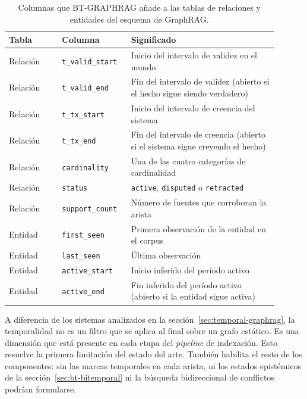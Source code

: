 \begin{table}[h]
\centering
\small
\begin{tabular}{p{0.18\linewidth}p{0.22\linewidth}p{0.50\linewidth}}
\hline
\textbf{Tabla} & \textbf{Columna} & \textbf{Significado} \\ \hline
Relación & \texttt{t\_valid\_start} & Inicio del intervalo de validez en el mundo \\
Relación & \texttt{t\_valid\_end} & Fin del intervalo de validez (abierto si el hecho sigue siendo verdadero) \\
Relación & \texttt{t\_tx\_start} & Inicio del intervalo de creencia del sistema \\
Relación & \texttt{t\_tx\_end} & Fin del intervalo de creencia (abierto si el sistema sigue creyendo el hecho) \\
Relación & \texttt{cardinality} & Una de las cuatro categorías de cardinalidad \\
Relación & \texttt{status} & \texttt{active}, \texttt{disputed} o \texttt{retracted} \\
Relación & \texttt{support\_count} & Número de fuentes que corroboran la arista \\
Entidad  & \texttt{first\_seen} & Primera observación de la entidad en el corpus \\
Entidad  & \texttt{last\_seen} & Última observación \\
Entidad  & \texttt{active\_start} & Inicio inferido del período activo \\
Entidad  & \texttt{active\_end}   & Fin inferido del período activo (abierto si la entidad sigue activa) \\ \hline
\end{tabular}
\caption{Columnas que BT-GRAPHRAG añade a las tablas de relaciones y entidades del esquema de GraphRAG.}
\label{tab:bt-schema}
\end{table}

A diferencia de los sistemas analizados en la sección~\ref{sec:temporal-graphrag}, la temporalidad no es un filtro que se aplica al final sobre un grafo estático. Es una dimensión que está presente en cada etapa del \emph{pipeline} de indexación. Esto resuelve la primera limitación del estado del arte. También habilita el resto de los componentes: sin las marcas temporales en cada arista, ni los estados epistémicos de la sección~\ref{sec:bt-bitemporal} ni la búsqueda bidireccional de conflictos podrían formularse.

